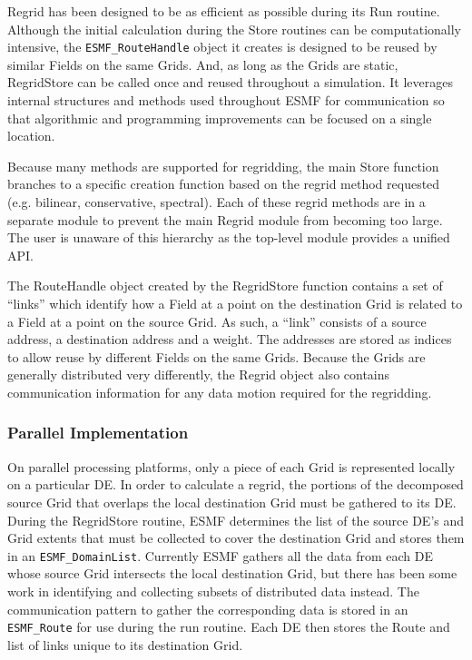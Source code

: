 


Regrid has been designed to be as efficient as possible during its
Run routine.  Although the initial calculation during the Store routines
can be computationally intensive, the {\tt ESMF\_RouteHandle} object
it creates is designed to be reused by similar Fields on the same Grids.
And, as long as the Grids are static, RegridStore can be called once
and reused throughout a simulation.  It leverages internal structures
and methods used throughout ESMF for communication so that algorithmic
and programming improvements can be focused on a single location.

Because many methods are supported for regridding, the main Store function
branches to a specific creation function based on the regrid method requested
(e.g. bilinear, conservative, spectral).  Each of these regrid methods are in
a separate module to prevent the main Regrid module from becoming too
large.  The user is unaware of this hierarchy as the top-level module provides
a unified API.

The RouteHandle object created by the RegridStore function contains a set of
``links'' which identify how a Field at a point on the destination Grid is
related to a Field at a point on the source Grid.  As such, a ``link''
consists of a source address, a destination address and a weight.  The addresses
are stored as indices to allow reuse by different Fields on the same Grids.
Because the Grids are generally distributed very differently, the Regrid object
also contains communication information for any data motion required for the
regridding.

\subsubsection{Parallel Implementation}

On parallel processing platforms, only a piece of each Grid is represented 
locally on a particular DE.  In order to calculate a regrid, the portions of
the decomposed source Grid that overlaps the local destination Grid must be
gathered to its DE.  During the RegridStore routine, ESMF determines the
list of the source DE's and Grid extents that must be collected to cover the
destination Grid and stores them in an {\tt ESMF\_DomainList}.  Currently
ESMF gathers all the data from each DE whose source Grid intersects
the local destination Grid, but there has been some work in identifying and
collecting subsets of distributed data instead.  The communication pattern
to gather the corresponding data is stored in an {\tt ESMF\_Route} for use
during the run routine.  Each DE then stores the Route and list of links
unique to its destination Grid.

